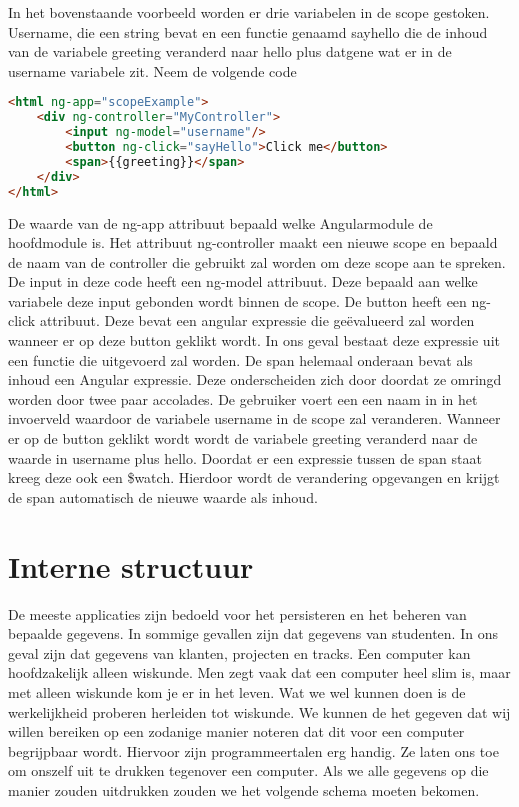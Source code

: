 \documentclass[a4paper,11pt]{article}
\begin{document}
In het bovenstaande voorbeeld worden er drie variabelen in de scope gestoken. Username, die een string bevat en een functie genaamd sayhello die de inhoud van de variabele greeting veranderd naar hello plus datgene wat er in de username variabele zit. Neem de volgende code

\begin{lstlisting}[language=html]
<html ng-app="scopeExample">
	<div ng-controller="MyController">
		<input ng-model="username"/>
		<button ng-click="sayHello">Click me</button>
		<span>{{greeting}}</span>
	</div>
</html>
\end{lstlisting}
De waarde van de ng-app attribuut bepaald welke Angularmodule de hoofdmodule is. Het attribuut ng-controller maakt een nieuwe scope en bepaald de naam van de controller die gebruikt zal worden om deze scope aan te spreken. De input in deze code heeft een ng-model attribuut. Deze bepaald aan welke variabele deze input gebonden wordt binnen de scope. De button heeft een ng-click attribuut. Deze bevat een angular expressie die geëvalueerd zal worden wanneer er op deze button geklikt wordt. In ons geval bestaat deze expressie uit een functie die uitgevoerd zal worden. De span helemaal onderaan bevat als inhoud een Angular expressie. Deze onderscheiden zich door doordat ze omringd worden door twee paar accolades. De gebruiker voert een een naam in in het invoerveld waardoor de variabele username in de scope zal veranderen. Wanneer er op de button geklikt wordt wordt de variabele greeting veranderd naar de waarde in username plus hello. Doordat er een expressie tussen de span staat kreeg deze ook een \$watch. Hierdoor wordt de verandering opgevangen en krijgt de span automatisch de nieuwe waarde als inhoud.

\section{Interne structuur} %
De meeste applicaties zijn bedoeld voor het persisteren en het beheren van bepaalde gegevens. In sommige gevallen zijn dat gegevens van studenten. In ons geval zijn dat gegevens van klanten, projecten en tracks. Een computer kan hoofdzakelijk alleen wiskunde. Men zegt vaak dat een computer heel slim is, maar met alleen wiskunde kom je er in het leven. Wat we wel kunnen doen is de werkelijkheid proberen herleiden tot wiskunde. We kunnen de het gegeven dat wij willen bereiken op een zodanige manier noteren dat dit voor een computer begrijpbaar wordt. Hiervoor zijn programmeertalen erg handig. Ze laten ons toe om onszelf uit te drukken tegenover een computer. Als we alle gegevens op die manier zouden uitdrukken zouden we het volgende schema moeten bekomen.
\end{document}
